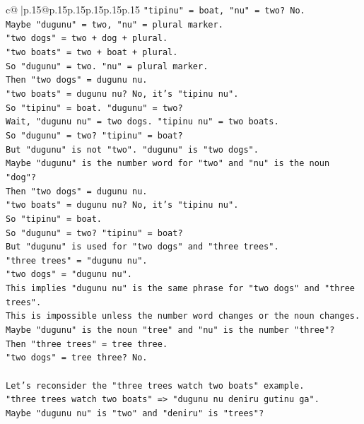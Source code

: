 \documentclass{article}
\begin{document}
{\begin{supertabular}{c@{$\;$}|p{.15\linewidth}@{}p{.15\linewidth}p{.15\linewidth}p{.15\linewidth}p{.15\linewidth}p{.15\linewidth}}
{{{\texttt{"tipinu" = boat, "nu" = two? No.} \\
\texttt{Maybe "dugunu" = two, "nu" = plural marker.} \\
\texttt{"two dogs" = two + dog + plural.} \\
\texttt{"two boats" = two + boat + plural.} \\
\texttt{So "dugunu" = two. "nu" = plural marker.} \\
\texttt{Then "two dogs" = dugunu nu.} \\
\texttt{"two boats" = dugunu nu? No, it's "tipinu nu".} \\
\texttt{So "tipinu" = boat. "dugunu" = two?} \\
\texttt{Wait, "dugunu nu" = two dogs. "tipinu nu" = two boats.} \\
\texttt{So "dugunu" = two? "tipinu" = boat?} \\
\texttt{But "dugunu" is not "two". "dugunu" is "two dogs".} \\
\texttt{Maybe "dugunu" is the number word for "two" and "nu" is the noun "dog"?} \\
\texttt{Then "two dogs" = dugunu nu.} \\
\texttt{"two boats" = dugunu nu? No, it's "tipinu nu".} \\
\texttt{So "tipinu" = boat.} \\
\texttt{So "dugunu" = two? "tipinu" = boat?} \\
\texttt{But "dugunu" is used for "two dogs" and "three trees".} \\
\texttt{"three trees" = "dugunu nu".} \\
\texttt{"two dogs" = "dugunu nu".} \\
\texttt{This implies "dugunu nu" is the same phrase for "two dogs" and "three trees".} \\
\texttt{This is impossible unless the number word changes or the noun changes.} \\
\texttt{Maybe "dugunu" is the noun "tree" and "nu" is the number "three"?} \\
\texttt{Then "three trees" = tree three.} \\
\texttt{"two dogs" = tree three? No.} \\
\\ 
\texttt{Let's reconsider the "three trees watch two boats" example.} \\
\texttt{"three trees watch two boats" => "dugunu nu deniru gutinu ga".} \\
\texttt{Maybe "dugunu nu" is "two" and "deniru" is "trees"?} \\
}}}
\end{supertabular}}
\end{document}
